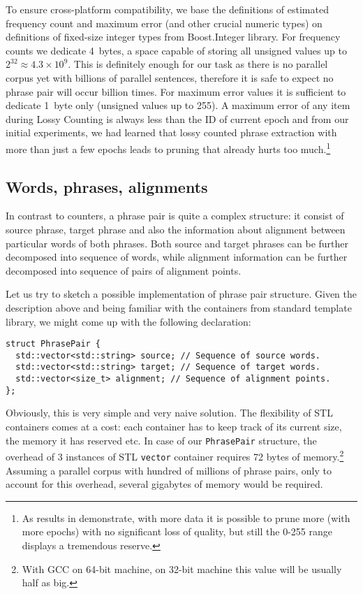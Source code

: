 To ensure cross-platform compatibility, we base the definitions of estimated frequency count and
maximum error (and other crucial numeric types) on definitions of fixed-size integer types from
Boost.Integer library.
For frequency counts we dedicate 4~bytes, a space capable of storing all unsigned values up to
$2^{32} \approx 4.3 \times 10^9$. This is definitely enough for our task as there is no
parallel corpus yet with billions of parallel sentences, therefore it is safe to expect no phrase
pair will occur billion times.
For maximum error values it is sufficient to dedicate 1~byte only (unsigned values up to 255).
A maximum error of any item during Lossy Counting is always less than the ID of current epoch and
from our initial experiments, we had learned that lossy counted phrase extraction with more than just
a few epochs leads to pruning that already hurts too much.\footnote{As results in 
demonstrate, with more data it is possible to prune more (with more epochs) with no significant
loss of quality, but still the 0-255 range displays a tremendous reserve.}

\subsection{Words, phrases, alignments}


In contrast to counters, a phrase pair is quite a complex structure: it consist of source phrase,
target phrase and also the information about alignment between particular words of both phrases.
Both source and target phrases can be further decomposed into sequence of words, while alignment
information can be further decomposed into sequence of pairs of alignment points.

Let us try to sketch a possible implementation of phrase pair structure.
Given the description above and being familiar with the containers from standard
template library, we might come up with the following declaration:
\begin{verbatim}
struct PhrasePair {
  std::vector<std::string> source; // Sequence of source words.
  std::vector<std::string> target; // Sequence of target words.
  std::vector<size_t> alignment; // Sequence of alignment points.
};
\end{verbatim}

Obviously, this is very simple and very naive solution.
The flexibility of STL containers comes at a cost: each container has to keep track of its
current size, the memory it has reserved etc.
In case of our \texttt{PhrasePair} structure, the overhead of 3 instances of STL \texttt{vector}
container requires 72 bytes of memory.\footnote{With GCC on 64-bit machine, on 32-bit machine
this value will be usually half as big.}
Assuming a parallel corpus with hundred of millions of phrase pairs, only to account for
this overhead, several gigabytes of memory would be required.

